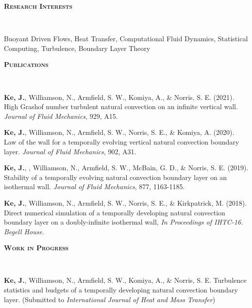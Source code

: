 \documentclass[letterpaper, 10pt]{article}
\newenvironment{changemargin}[2]{%
  \begin{list}{}{%
      \setlength{\topsep}{0pt}%
      \setlength{\leftmargin}{#1}%
      \setlength{\rightmargin}{#2}%
      \setlength{\listparindent}{\parindent}%
      \setlength{\itemindent}{\parindent}%
      \setlength{\parsep}{\parskip}%
    }%
  \item[]}{\end{list}
}
\newcommand{\lineover}{
  \begin{changemargin}{-0.05in}{-0.05in}
    \vspace*{-8pt}
    \hrulefill \\
    \vspace*{-2pt}
  \end{changemargin}
}
\newcommand{\header}[1]{
  \begin{changemargin}{-0.5in}{-0.5in}
    \textbf{\scshape{#1}}\\
    \lineover
  \end{changemargin}
}
\newenvironment{body} {
  \vspace*{-16pt}
  \begin{changemargin}{-0.25in}{-0.5in}
  }
  {\end{changemargin}
}
\begin{document}
\header{Research Interests}
Buoyant Driven Flows, Heat Transfer, Computational Fluid Dynamics, Statistical Computing, Turbulence, Boundary Layer Theory
\smallskip



\header{Publications}
\begin{body}
  \vspace{14pt}
    
  \textbf{Ke, J.}, Williamson, N., Armfield, S. W., Komiya, A., \& Norris, S. E. (2021).  High Grashof number turbulent natural convection on an infinite vertical wall. \emph{Journal of Fluid Mechanics}, 929, A15.
  
  \smallskip
  
  \textbf{Ke, J.}, Williamson, N., Armfield, S. W., Norris, S. E., \& Komiya, A.  (2020). Law of the wall for a temporally evolving vertical natural convection boundary layer. \emph{Journal of Fluid Mechanics}, 902, A31.
  
  \smallskip

  \textbf{Ke, J.}, , Williamson, N., Armfield, S. W., McBain, G. D., \& Norris, S. E. (2019). Stability of a temporally evolving natural convection boundary layer on an isothermal wall. \emph{Journal of Fluid Mechanics}, 877, 1163-1185.

  \smallskip

  \textbf{Ke, J.}, Williamson, N., Armfield, S. W., Norris, S. E., \& Kirkpatrick, M. (2018). Direct numerical simulation of a temporally developing natural convection boundary layer on a doubly-infinite isothermal wall, \emph{In Proceedings of IHTC-16. Begell House}. %
  

\end{body}
\smallskip


\header{Work in Progress}
\begin{body}
  \vspace{14pt}

  \textbf{Ke, J.}, Williamson, N., Armfield, S. W., Komiya, A., \& Norris, S. E.  Turbulence statistics and budgets of a temporally developing natural convection boundary layer. (Submitted to \emph{International Journal of Heat and Mass Transfer})
\end{body}
\smallskip
\end{document}
